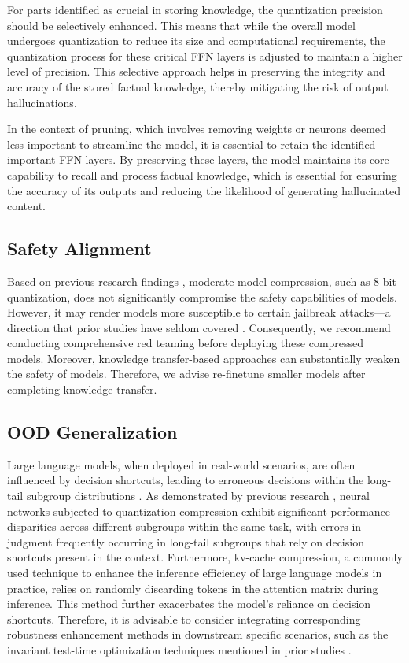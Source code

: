 For parts identified as crucial in storing knowledge, the quantization precision should be selectively enhanced. This means that while the overall model undergoes quantization to reduce its size and computational requirements, the quantization process for these critical FFN layers is adjusted to maintain a higher level of precision. This selective approach helps in preserving the integrity and accuracy of the stored factual knowledge, thereby mitigating the risk of output hallucinations.

In the context of pruning, which involves removing weights or neurons deemed less important to streamline the model, it is essential to retain the identified important FFN layers. By preserving these layers, the model maintains its core capability to recall and process factual knowledge, which is essential for ensuring the accuracy of its outputs and reducing the likelihood of generating hallucinated content.

\subsection{Safety Alignment}
Based on previous research findings \cite{yuan2023rptq}, moderate model compression, such as 8-bit quantization, does not significantly compromise the safety capabilities of models. However, it may render models more susceptible to certain jailbreak attacks—a direction that prior studies have seldom covered \cite{deng2023jailbreaker}. Consequently, we recommend conducting comprehensive red teaming before deploying these compressed models. Moreover, knowledge transfer-based approaches can substantially weaken the safety of models. Therefore, we advise re-finetune smaller models after completing knowledge transfer.

\subsection{OOD Generalization}
Large language models, when deployed in real-world scenarios, are often influenced by decision shortcuts, leading to erroneous decisions within the long-tail subgroup distributions \cite{geirhos2020shortcut}. As demonstrated by previous research \cite{yuan2023benchmarking}, neural networks subjected to quantization compression exhibit significant performance disparities across different subgroups within the same task, with errors in judgment frequently occurring in long-tail subgroups that rely on decision shortcuts present in the context. Furthermore, kv-cache compression, a commonly used technique to enhance the inference efficiency of large language models in practice, relies on randomly discarding tokens in the attention matrix during inference. This method further exacerbates the model's reliance on decision shortcuts. Therefore, it is advisable to consider integrating corresponding robustness enhancement methods in downstream specific scenarios, such as the invariant test-time optimization techniques mentioned in prior studies \cite{ma2024invariant}.
